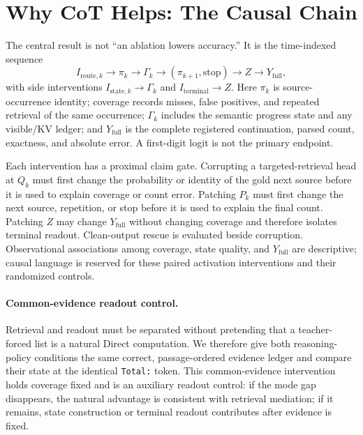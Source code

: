 \documentclass[10pt,twocolumn]{article}
\begin{document}
\section{Why CoT Helps: The Causal Chain}
The central result is not ``an ablation lowers accuracy.'' It is the time-indexed sequence
\begin{equation}
 I_{\mathrm{route},k}
 \longrightarrow \pi_k
 \longrightarrow \Gamma_k
 \longrightarrow (\pi_{k+1},\mathrm{stop})
 \longrightarrow Z
 \longrightarrow Y_{\mathrm{full}},
\label{eq:causal-chain}
\end{equation}
with side interventions
$I_{\mathrm{state},k}\rightarrow\Gamma_k$ and
$I_{\mathrm{terminal}}\rightarrow Z$. Here $\pi_k$ is source-occurrence identity;
coverage records misses, false positives, and repeated retrieval of the same occurrence;
$\Gamma_k$ includes the semantic progress state and any visible/KV ledger; and
$Y_{\mathrm{full}}$ is the complete registered continuation, parsed count, exactness, and
absolute error. A first-digit logit is not the primary endpoint.

Each intervention has a proximal claim gate. Corrupting a targeted-retrieval head at $Q_k$ must
first change the probability or identity of the gold next source before it is used to explain
coverage or count error. Patching $P_k$ must first change the next source, repetition, or stop
before it is used to explain the final count. Patching $Z$ may change
$Y_{\mathrm{full}}$ without changing coverage and therefore isolates terminal readout.
Clean-output rescue is evaluated beside corruption. Observational associations among coverage,
state quality, and $Y_{\mathrm{full}}$ are descriptive; causal language is reserved for these
paired activation interventions and their randomized controls.

\paragraph{Common-evidence readout control.}
Retrieval and readout must be separated without pretending that a teacher-forced list is a
natural Direct computation. We therefore give both reasoning-policy conditions the same
correct, passage-ordered evidence ledger and compare their state at the identical
\texttt{Total:} token. This common-evidence intervention holds coverage fixed and is an
auxiliary readout control:
if the mode gap disappears, the natural advantage is consistent with retrieval mediation;
if it remains, state construction or terminal readout contributes after evidence is fixed.
\end{document}

